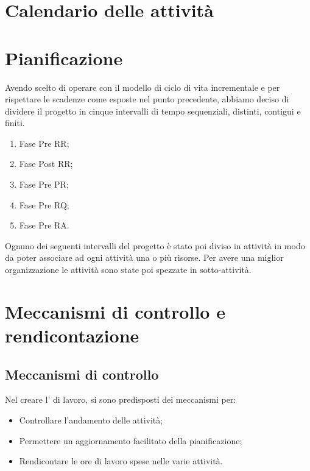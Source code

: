 \newpage


\section{Calendario delle attività}


\newpage


\section{Pianificazione}
\label{3.0}
Avendo scelto di operare con il modello di ciclo di vita incrementale e per rispettare le scadenze come esposte nel punto precedente, abbiamo deciso di dividere il progetto in cinque intervalli di tempo sequenziali, distinti, contigui e finiti.

\begin{enumerate}
\item Fase Pre RR;
\item Fase Post RR;
\item Fase Pre PR;
\item Fase Pre RQ;
\item Fase Pre RA.
\end{enumerate}

Ognuno dei seguenti intervalli del progetto è stato poi diviso in attività in modo da poter associare ad ogni attività una o più risorse. Per avere una miglior organizzazione le attività sono state poi spezzate in sotto-attività.



\newpage


\newpage


\newpage


\newpage


\newpage


\newpage


\newpage

\section{Meccanismi di controllo e rendicontazione}
\subsection{Meccanismi di controllo}
Nel creare l' di lavoro, si sono predisposti dei meccanismi per:
\begin{itemize}
\item Controllare l'andamento delle attività;
\item Permettere un aggiornamento facilitato della pianificazione;
\item Rendicontare le ore di lavoro spese nelle varie attività.
\end{itemize}
